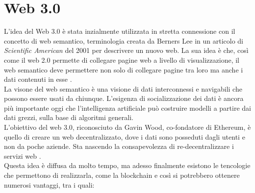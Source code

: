 \section{Web 3.0}
L'idea del Web 3.0 è stata inzialmente utilizzata in stretta connessione con il concetto di web semantico, terminologia creata da Berners Lee in un articolo di \textit{Scientific American} del 2001 per descrivere un nuovo web. 
La sua idea è che, così come il web 2.0 permette di collegare pagine web a livello di visualizzazione, il web semantico deve permettere non solo di collegare pagine tra loro ma anche i dati contenuti in esse \cite{ted_youtube}.
\\La visone del web semantico è una visione di dati interconnessi e navigabili che possono essere usati da chiunque. L'esigenza di socializzazione dei dati è ancora più importante oggi che l'intelligenza artificiale può costruire modelli a partire dai dati grezzi, sulla base di algoritmi generali.
\\L'obiettivo del web 3.0, riconosciuto da Gavin Wood, co-fondatore di Ethereum, è quello di creare un web decentralizzato, dove i dati sono posseduti dagli utenti e non da poche aziende. Sta nascendo la consapevolezza di re-decentralizzare i servizi web \cite{Blockchain_tecnologia_e_applicazioni_per_il_business}.
\\Questa idea è diffusa da molto tempo, ma adesso finalmente esistono le tencologie che permettono di realizzarla, come la blockchain 
e così si potrebbero ottenere numerosi vantaggi, tra i quali:
